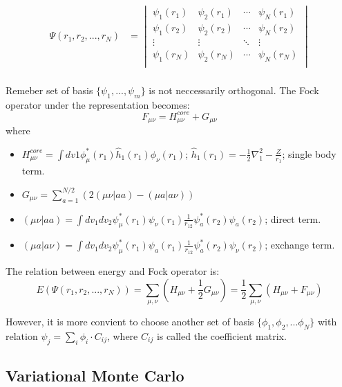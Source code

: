 \documentclass[11pt]{article}
\begin{document}
\begin{align*}
    \Psi(r_1, r_2, ..., r_N) &= 
    \begin{vmatrix}
    \psi_1(r_1) & \psi_2(r_1)  & \cdots & \psi_N(r_1) \\ 
    \psi_1(r_2) & \psi_2(r_2) & \cdots & \psi_N(r_2) \\ 
    \vdots & \vdots& \ddots & \vdots \\
    \psi_1(r_N) & \psi_2(r_N) & \cdots & \psi_N(r_N) \\ 
    \end{vmatrix} \\
\end{align*}

Remeber set of basis $\{\psi_1, ... , \psi_m\}$ is not neccessarily orthogonal. The Fock operator under the representation becomes:
\begin{equation}\label{eq:fock-representation}
    F_{\mu\nu}=H^{core}_{\mu\nu} + G_{\mu\nu}
\end{equation}
where 
\begin{itemize}
    \item $H^{core}_{\mu \nu} = \int{dv1 \phi_{\mu}^*(r_1)\hat{h}_1(r_1)\phi_{\nu}(r_1)}$; $\hat{h}_1(r_1)=-\frac{1}{2}\nabla^2_1-\frac{Z}{r_1}$; single body term.
    \item $G_{\mu\nu} = \sum_{a=1}^{N/2}(2(\mu\nu|aa)-(\mu a|a\nu))$
    \item $(\mu\nu|aa)=\int{dv_1 dv_2 \psi_{\mu}^*(r_1)\psi_{\nu}(r_1) \frac{1}{r_{12}} \psi_a^*(r_2)\psi_a(r_2)}$; direct term.
    \item $(\mu a|a\nu)=\int{dv_1 dv_2 \psi_{\mu}^*(r_1)\psi_{a}(r_1) \frac{1}{r_{12}} \psi_a^*(r_2)\psi_{\nu}(r_2)}$; exchange term.
\end{itemize}

The relation between energy and Fock operator is:
\begin{equation}
    E(\Psi(r_1, r_2, ..., r_N)) = \sum_{\mu, \nu} (H_{\mu\nu} + \frac{1}{2}G_{\mu\nu}) = \frac{1}{2} \sum_{\mu, \nu} (H_{\mu\nu} + F_{\mu\nu})
\end{equation}

However, it is more convient to choose another set of basis $\{\phi_1, \phi_2, ... \phi_N\}$ with relation $\psi_j = \sum_{i}\phi_{i} \cdot C_{ij}$, where $C_{ij}$ is called the coefficient matrix. 

\subsection{Variational Monte Carlo}
\end{document}
